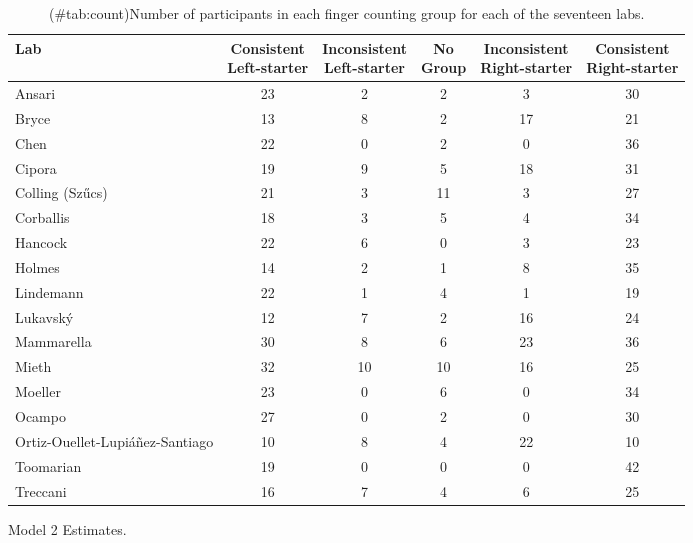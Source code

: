 \begin{appendix}
\begin{table}
\caption{(\#tab:count)Number of participants in each finger counting group for each of the seventeen labs.}
\centering
\begin{tabular}[t]{lccccc}
\toprule
Lab & \makecell[c]{Consistent\\Left-starter} & \makecell[c]{Inconsistent\\Left-starter} & \makecell[c]{No\\Group} & \makecell[c]{Inconsistent\\Right-starter} & \makecell[c]{Consistent\\Right-starter}\\
\midrule
Ansari & 23 & 2 & 2 & 3 & 30\\
Bryce & 13 & 8 & 2 & 17 & 21\\
Chen & 22 & 0 & 2 & 0 & 36\\
Cipora & 19 & 9 & 5 & 18 & 31\\
Colling (Szűcs) & 21 & 3 & 11 & 3 & 27\\
Corballis & 18 & 3 & 5 & 4 & 34\\
Hancock & 22 & 6 & 0 & 3 & 23\\
Holmes & 14 & 2 & 1 & 8 & 35\\
Lindemann & 22 & 1 & 4 & 1 & 19\\
Lukavský & 12 & 7 & 2 & 16 & 24\\
Mammarella & 30 & 8 & 6 & 23 & 36\\
Mieth & 32 & 10 & 10 & 16 & 25\\
Moeller & 23 & 0 & 6 & 0 & 34\\
Ocampo & 27 & 0 & 2 & 0 & 30\\
Ortiz-Ouellet-Lupiáñez-Santiago & 10 & 8 & 4 & 22 & 10\\
Toomarian & 19 & 0 & 0 & 0 & 42\\
Treccani & 16 & 7 & 4 & 6 & 25\\
\bottomrule
\end{tabular}
\end{table}

\begin{table}[!p]
\caption{\label{tab:mod2}Model 2 Estimates.}
\begin{subtable}{\textwidth}
\centering
\begin{table}[H]\centering\begingroup\fontsize{10}{12}\selectfont


\end{table}
\end{subtable}
\end{table}
\end{appendix}
